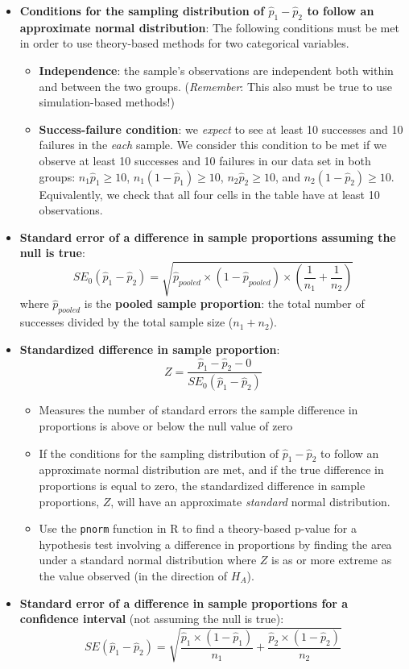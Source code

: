 \documentclass[
]{report}
\begin{document}
\begin{itemize}
\item
  \textbf{Conditions for the sampling distribution of \(\hat{p}_1-\hat{p}_2\) to follow an approximate normal distribution}: The following conditions must be met in order to use theory-based methods for two categorical variables.

  \begin{itemize}
  \item
    \textbf{Independence}: the sample's observations are independent both within and between the two groups. (\emph{Remember}: This also must be true to use simulation-based methods!)
  \item
    \textbf{Success-failure condition}: we \emph{expect} to see at least 10 successes and 10 failures in the \emph{each} sample. We consider this condition to be met if we observe at least 10 successes and 10 failures in our data set in both groups: \(n_1\hat{p}_1\geq10\), \(n_1(1-\hat{p}_1)\geq10\), \(n_2\hat{p}_2\geq10\), and \(n_2(1-\hat{p}_2)\geq10\). Equivalently, we check that all four cells in the table have at least 10 observations.
  \end{itemize}
\item
  \textbf{Standard error of a difference in sample proportions assuming the null is true}:
  \[SE_0(\hat{p}_1 - \hat{p}_2) = \sqrt{\hat{p}_{pooled} \times (1-\hat{p}_{pooled}) \times \left(\frac{1}{n_1}+\frac{1}{n_2}\right)}\]
  where \(\hat{p}_{pooled}\) is the \textbf{pooled sample proportion}: the total number of successes divided by the total sample size (\(n_1+n_2\)).
\item
  \textbf{Standardized difference in sample proportion}:
  \[Z = \frac{\hat{p}_1-\hat{p}_2-0}{SE_0(\hat{p}_1 - \hat{p}_2)}\]

  \begin{itemize}
  \item
    Measures the number of standard errors the sample difference in proportions is above or below the null value of zero
  \item
    If the conditions for the sampling distribution of \(\hat{p}_1 - \hat{p}_2\) to follow an approximate normal distribution are met, and if the true difference in proportions is equal to zero, the standardized difference in sample proportions, \(Z\), will have an approximate \emph{standard} normal distribution.
  \item
    Use the \texttt{pnorm} function in R to find a theory-based p-value for a hypothesis test involving a difference in proportions by finding the area under a standard normal distribution where \(Z\) is as or more extreme as the value observed (in the direction of \(H_A\)).
  \end{itemize}
\item
  \textbf{Standard error of a difference in sample proportions for a confidence interval} (not assuming the null is true):
  \[SE(\hat{p}_1-\hat{p}_2) = \sqrt{\frac{\hat{p}_1 \times (1-\hat{p}_1)}{n_1}+\frac{\hat{p}_2 \times  (1-\hat{p}_2)}{n_2}}\]


\end{itemize}
\end{document}
